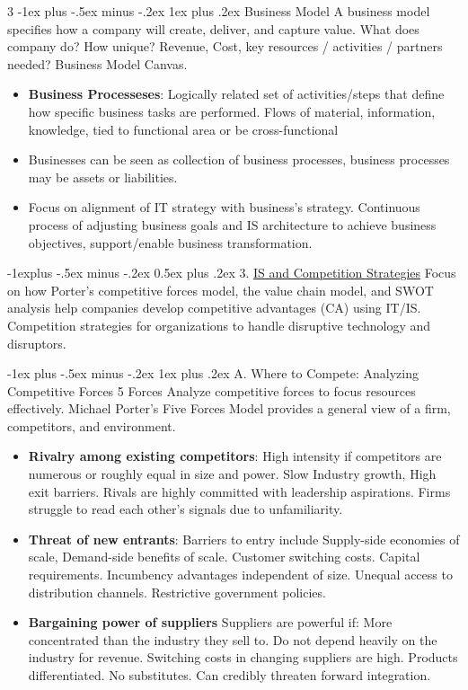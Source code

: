 \documentclass[10pt, landscape]{article}
\makeatletter
\renewcommand{\subsection}{\@startsection{subsection}{2}{0mm}%
                                {-1explus -.5ex minus -.2ex}%
                                {0.5ex plus .2ex}%
                                {\normalfont\normalsize\bfseries}}
\renewcommand{\subsubsection}{\@startsection{subsubsection}{3}{0mm}%
                                {-1ex plus -.5ex minus -.2ex}%
                                {1ex plus .2ex}%
                                {\normalfont\small\bfseries}}
\makeatother
\begin{document}
\begin{multicols*}{3}
\subsubsection{Business Model}
 A business model specifies how a company will create, deliver, and capture value. What does company do? How unique? Revenue, Cost, key resources / activities / partners needed? Business Model Canvas.
\begin{itemize}
\item \textbf{Business Processeses}:  Logically related set of activities/steps that define how specific business tasks are performed. Flows of material, information, knowledge, tied to functional area or be cross-functional
\item Businesses can be seen as collection of business processes, business processes may be assets or liabilities.
\item Focus on alignment of IT strategy with business’s strategy. Continuous process of adjusting business goals and IS architecture to achieve business objectives, support/enable business transformation.
\end{itemize}

\subsection{3. \underline{IS and Competition Strategies}}
Focus on how Porter’s competitive forces model, the value chain model, and SWOT analysis help companies develop competitive advantages (CA) using IT/IS. Competition strategies for organizations to handle disruptive 
technology and disruptors.

\subsubsection{A. Where to Compete: Analyzing Competitive Forces 5 Forces}
Analyze competitive forces to focus resources effectively. Michael Porter’s Five Forces Model provides a general view of a firm, competitors, and environment. 
\begin{itemize}
    \item \textbf{Rivalry among existing competitors}: High intensity if competitors are numerous or roughly equal in size and power. Slow Industry growth, High exit barriers.  Rivals are highly committed with leadership aspirations.  Firms struggle to read each other's signals due to unfamiliarity.  
    \item \textbf{Threat of new entrants}: Barriers to entry include Supply-side economies of scale, Demand-side benefits of scale. Customer switching costs. Capital requirements. Incumbency advantages independent of size. Unequal access to distribution channels. Restrictive government policies.  
    \item \textbf{Bargaining power of suppliers}  Suppliers are powerful if:  
            More concentrated than the industry they sell to.  
            Do not depend heavily on the industry for revenue.  
            Switching costs in changing suppliers are high.  
            Products differentiated.  
            No substitutes.  
            Can credibly threaten forward integration.  


\end{itemize}
\end{multicols*}
\end{document}
